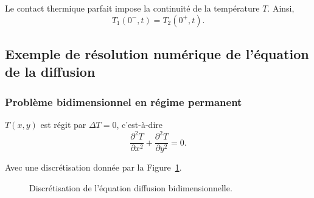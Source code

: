         Le contact thermique parfait impose la continuité de la température $T$. Ainsi,
        \begin{equation}
            \boxed{
                T_1(0^{-},t)=T_{2}(0^{+},t).
            }
        \end{equation}

    \subsection{Exemple de résolution numérique de l'équation de la diffusion}
        \subsubsection{Problème bidimensionnel en régime permanent}
            $T(x,y)$ est régit par $\Delta T=0$, c'est-à-dire
            \begin{equation}
                \frac{\partial^{2}T}{\partial x^{2}}+\frac{\partial^{2}T}{\partial y^{2}}=0.
            \end{equation}

            Avec une discrétisation donnée par la Figure~\ref{fig:discretisation_equation_diffusion_bidimensionnelle}.

            \begin{figure}
                \centering
                \caption{Discrétisation de l'équation diffusion bidimensionnelle.}    
                \label{fig:discretisation_equation_diffusion_bidimensionnelle}
            \end{figure}

